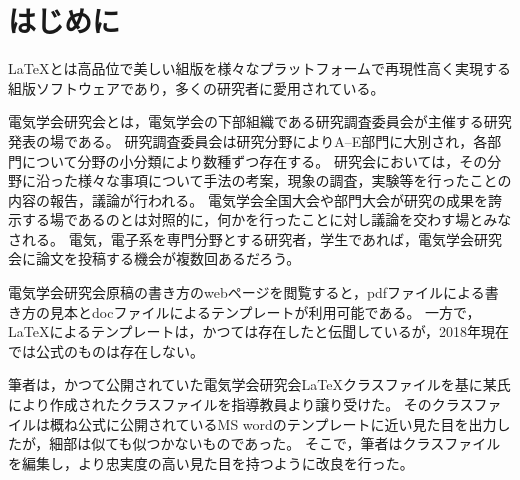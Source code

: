\documentclass[fleqn]{ieej-tec2}%
\begin{document}
%
\begin{abstract}
The class file \texttt{ieej-tec2.cls} has been developed for typesetting articles of IEEJ technical meeting.
The official class file for the meeting used to exist. However it is no longer available.
It is a very big problem for \TeX nicians.
I inherited the class file for the technical meeting from my supervisor, 
and editted some codes in order to achieve higher fidelity to the official MS word template.
Happy \TeX ing!!
\end{abstract}
\maketitle
%
%

\section{はじめに}
\LaTeX{}とは高品位で美しい組版を様々なプラットフォームで再現性高く実現する組版ソフトウェアであり，多くの研究者に愛用されている。

電気学会研究会とは，電気学会の下部組織である研究調査委員会が主催する研究発表の場である。
研究調査委員会は研究分野によりA--E部門に大別され，各部門について分野の小分類により数種ずつ存在する。
研究会においては，その分野に沿った様々な事項について手法の考案，現象の調査，実験等を行ったことの内容の報告，議論が行われる。
電気学会全国大会や部門大会が研究の成果を誇示する場であるのとは対照的に，何かを行ったことに対し議論を交わす場とみなされる。
電気，電子系を専門分野とする研究者，学生であれば，電気学会研究会に論文を投稿する機会が複数回あるだろう。

電気学会研究会原稿の書き方のwebページ\cite{IEEJformat,IEEJformat2021}を閲覧すると，pdfファイルによる書き方の見本とdocファイルによるテンプレートが利用可能である。
一方で，\LaTeX{}によるテンプレートは，かつては存在したと伝聞しているが，2018年現在では公式のものは存在しない。

筆者は，かつて公開されていた電気学会研究会\LaTeX クラスファイルを基に某氏により作成されたクラスファイルを指導教員より譲り受けた。
そのクラスファイルは概ね公式に公開されているMS wordのテンプレートに近い見た目を出力したが，細部は似ても似つかないものであった。
そこで，筆者はクラスファイルを編集し，より忠実度の高い見た目を持つように改良を行った。
\end{document}

